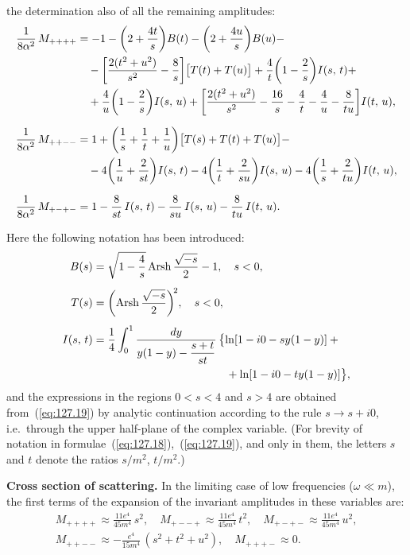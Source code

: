 \noindent the determination also of all the remaining amplitudes:
\begin{align}
\frac{1}{8\alpha^2}\,M_{++++} &= -1 - \biggl(2 + \frac{4t}{s}\biggr)B(t) - \biggl(2 + \frac{4u}{s}\biggr)B(u) - \notag\\
&\quad - \biggl[\frac{2(t^2 + u^2)}{s^2} - \frac{8}{s}\biggr]\bigl[T(t) + T(u)\bigr] + \frac{4}{t}\biggl(1 - \frac{2}{s}\biggr)I(s,\,t) + \notag\\
&\quad + \frac{4}{u}\biggl(1 - \frac{2}{s}\biggr)I(s,\,u) + \biggl[\frac{2(t^2 + u^2)}{s^2} - \frac{16}{s} - \frac{4}{t} - \frac{4}{u} - \frac{8}{tu}\biggr]I(t,\,u),
\label{eq:127.18}\\[6pt]
\frac{1}{8\alpha^2}\,M_{++--} &= 1 + \biggl(\frac{1}{s} + \frac{1}{t} + \frac{1}{u}\biggr)\bigl[T(s) + T(t) + T(u)\bigr] - \notag\\
&\quad - 4\biggl(\frac{1}{u} + \frac{2}{st}\biggr)I(s,\,t) - 4\biggl(\frac{1}{t} + \frac{2}{su}\biggr)I(s,\,u) - 4\biggl(\frac{1}{s} + \frac{2}{tu}\biggr)I(t,\,u),
\notag\\[6pt]
\frac{1}{8\alpha^2}\,M_{+-+-} &= 1 - \frac{8}{st}\,I(s,\,t) - \frac{8}{su}\,I(s,\,u) - \frac{8}{tu}\,I(t,\,u).
\notag
\end{align}

\noindent Here the following notation has been introduced:
\begin{align}
B(s) &= \sqrt{1 - \frac{4}{s}}\,\mathrm{Arsh}\,\frac{\sqrt{-s}}{2} - 1, \quad s < 0,\notag\\[4pt]
T(s) &= \biggl(\mathrm{Arsh}\,\frac{\sqrt{-s}}{2}\biggr)^{\!2}, \quad s < 0,
\label{eq:127.19}\\[4pt]
I(s,\,t) &= \frac{1}{4}\int_0^1 \frac{dy}{y(1-y) - \dfrac{s+t}{st}}\,\bigl\{\ln[1 - i0 - sy(1-y)] + {}\notag\\
&\hspace{12em}{}+ \ln[1 - i0 - ty(1-y)]\bigr\},\notag
\end{align}
and the expressions in the regions $0 < s < 4$ and $s > 4$ are obtained from~(\ref{eq:127.19}) by analytic continuation according to the rule $s \to s + i0$, i.e.\ through the upper half-plane of the complex variable. (For brevity of notation in formulae~(\ref{eq:127.18}),~(\ref{eq:127.19}), and only in them, the letters $s$ and $t$ denote the ratios $s/m^2$, $t/m^2$.)

\textbf{Cross section of scattering.} In the limiting case of low frequencies ($\omega \ll m$), the first terms of the expansion of the invariant amplitudes in these variables are:
\begin{equation}
\begin{gathered}
M_{++++} \approx \frac{11e^4}{45m^4}\,s^2, \quad M_{+--+} \approx \frac{11e^4}{45m^4}\,t^2, \quad M_{+-+-} \approx \frac{11e^4}{45m^4}\,u^2,\\[4pt]
M_{++--} \approx -\frac{e^4}{15m^4}\,(s^2 + t^2 + u^2), \quad M_{+++-} \approx 0.
\end{gathered}
\label{eq:127.20}
\end{equation}

